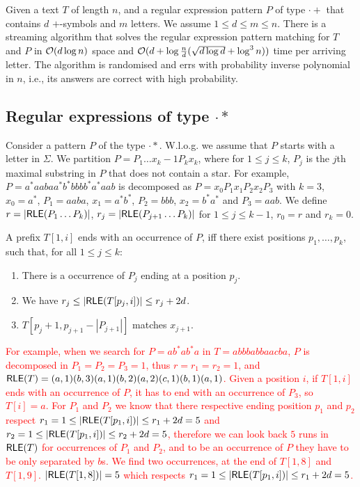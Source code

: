 \documentclass{article}
\begin{document}
\begin{corollary}
Given a text $T$ of length $n$, and a regular expression pattern $P$ of type $\cdot+$ that contains $d$ $+$-symbols and $m$ letters. We assume $1 \leq d \leq m \leq n$. There is a streaming algorithm that solves the regular expression pattern matching for $T$ and $P$ in $\mathcal{O}(d\log n)$ space and $\mathcal{O}(d + \log\frac{n}{d} (\sqrt{d\log d}+\log^3 n))$ time per arriving letter. The  algorithm  is  randomised  and  errs  with  probability inverse polynomial in $n$, i.e., its answers are correct with high probability.
\end{corollary}

\subsection{Regular expressions of type $\cdot*$}
\label{sec:dot-star}
Consider a pattern $P$ of the type $\cdot*$. W.l.o.g. we assume that $P$ starts with 
a letter in $\Sigma$. We partition $P= P_1 \ldots x_k-1 P_k x_k$, where for $1 \leq j \leq k$, $P_j$ is the $j$th maximal substring in $P$ that does not contain a star. 
For example, $P=a^*aabaa^*b^*bbbb^*a^*aab$ is decomposed as $P = x_0 P_1 x_1 P_2 x_2 P_3$ with $k=3$, $x_0=a^*$, $P_1=aaba$, $x_1 = a^* b^*$, $P_2 = bbb$, $x_2=b^* a^*$ and $P_3=aab$.
We define $r= |\textsf{RLE}(P_1 \ldots P_k)|$, $r_j = |\textsf{RLE}(P_{j+1} \ldots P_k)|$ for $1 \leq j \leq k-1$, $r_0=r$ and $r_k=0$.

\begin{observation}
\label{obs:structural.*}
A prefix $T[1,i]$ ends with an occurrence of $P$, iff there exist positions $p_1, \ldots, p_k$, such that, for all $1 \leq j \leq k$:
\begin{enumerate}
\item  There is a occurrence of $P_j$ ending at a position $p_j$.
\item We have $ r_{j} \leq |\textsf{RLE}(T[p_j,i])| \leq r_{j}+2d $.
\item $T[p_j+1,p_{j+1}-|P_{j+1}|]$ matches $x_{j+1}$. 
\end{enumerate}
\end{observation}

\textcolor{red}{For example, when we search for $P=ab^*ab^*a$ in $T=abbbabbaacba$, $P$ is decomposed in $P_1=P_2=P_3=1$, thus $r=r_1=r_2=1$, and $\textsf{RLE}(T)=(a,1)(b,3)(a,1)(b,2)(a,2)(c,1)(b,1)(a,1)$. 
Given a position $i$, if $T[1,i]$ ends with an occurrence of $P$, it has to end with an occurrence of $P_3$, so $T[i]=a$. 
For $P_1$ and $P_2$ we know that there respective ending position $p_1$ and $p_2$ respect $r_1= 1 \leq |\textsf{RLE}(T[p_1,i])| \leq r_1 +2d = 5 $ and  $r_2= 1 \leq |\textsf{RLE}(T[p_1,i])| \leq r_2 +2d = 5 $, therefore we can look back $5$ runs in $\textsf{RLE}(T)$ for occurrences of $P_1$ and $P_2$, and to be an occurrence of $P$ they have to be only separated by $b$s. 
We find two occurrences, at the end of $T[1,8]$ and $T[1,9]$. $|\textsf{RLE}(T[1,8])| = 5$ which respects  $r_1= 1 \leq |\textsf{RLE}(T[p_1,i])| \leq r_1 +2d = 5 $.}
\end{document}
